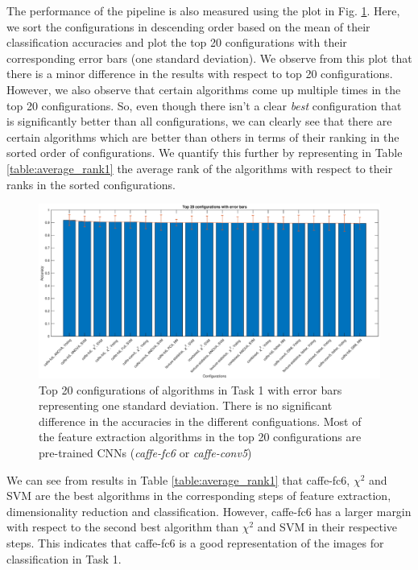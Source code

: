 The performance of the pipeline is also measured using the plot in Fig. \ref{fig:error_bars1}. Here, we sort the configurations in descending order based on the mean of their classification accuracies and plot the top 20 configurations with their corresponding error bars (one standard deviation).  We observe from this plot that there is a minor difference in the results with respect to top 20 configurations. However, we also observe that certain algorithms come up multiple times in the top 20 configurations. So, even though there isn't a clear \textit{best} configuration that is significantly better than all configurations, we can clearly see that there are certain algorithms which are better than others in terms of their ranking in the sorted order of configurations. We quantify this further by representing in Table \ref{table:average_rank1} the average rank of the algorithms with respect to their ranks in the sorted configurations. 
\begin{figure}[ht!]
  \begin{centering}
 \includegraphics[scale=0.4]{img/best_matsc_error_bars_20.eps}
 \caption{Top 20 configurations of algorithms in Task 1 with error bars representing one standard deviation. There is no significant difference in the accuracies in the different configuations. Most of the feature extraction algorithms in the top 20 configurations are pre-trained CNNs (\textit{caffe-fc6} or \textit{caffe-conv5})}
 \label{fig:error_bars1}
 \end{centering}
\end{figure}

We can see from results in Table \ref{table:average_rank1} that caffe-fc6, $\chi^2$ and SVM are the best algorithms in the corresponding steps of feature extraction, dimensionality reduction and classification. However, caffe-fc6 has a larger margin with respect to the second best algorithm than $\chi^2$ and SVM in their respective steps. This indicates that caffe-fc6 is a good representation of the images for classification in Task 1.

